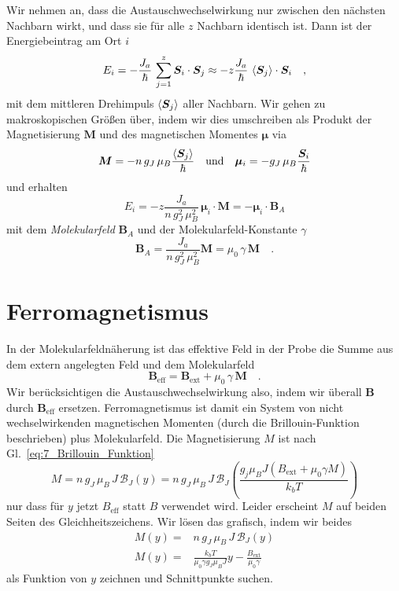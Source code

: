 Wir nehmen an, dass die Austauschwechselwirkung nur zwischen den nächsten Nachbarn wirkt, und dass sie für alle $z$  Nachbarn identisch ist. Dann ist der Energiebeintrag am Ort $i$
\begin{equation}
    E_i = - \frac{J_a}{\hbar} \, \sum_{j=1}^z \bm{S}_i \cdot \bm{S}_j 
    \approx
    - z \frac{J_a}{\hbar} \, \braket{\bm{S}_j} \cdot \bm{S}_i   \quad ,
\end{equation}
mit dem mittleren Drehimpuls $ \braket{\bm{S}_j}$ aller Nachbarn. Wir gehen zu makroskopischen Größen über, indem wir dies umschreiben als Produkt der Magnetisierung $\bm{M}$ und des magnetischen Momentes $\bm{\mu}$ via 
\begin{equation}
    \bm{M} = - n \, g_J \, \mu_B \frac{ \braket{\bm{S}_j}}{\hbar}
    \quad \text{und} \quad
    \bm{\mu}_i = - g_J  \, \mu_B \frac{ \bm{S}_i}{\hbar}
\end{equation}
und erhalten
\begin{equation}
    E_i  = - z \frac{J_a}{n \, g_J^2 \, \mu_B^2} \, \bm{\mu}_i  \cdot \bm{M}  = - \bm{\mu}_i \cdot \bm{B}_A
\end{equation}
mit dem \emph{Molekularfeld} $\bm{B}_A$ und der Molekularfeld-Konstante $\gamma$
\begin{equation}
    \bm{B}_A = \frac{J_a}{n \, g_J^2 \, \mu_B^2} \bm{M} 
   = \mu_0 \, \gamma \, \bm{M}   \quad . 
\end{equation}

\section*{Ferromagnetismus}

In  der Molekularfeldnäherung ist das effektive Feld in der Probe die Summe aus dem extern angelegten Feld und dem Molekularfeld
\begin{equation}
    \bm{B}_\text{eff} = \bm{B}_\text{ext} +  \mu_0 \, \gamma \, \bm{M}  \quad .
\end{equation}
Wir berücksichtigen die Austauschwechselwirkung also, indem wir überall $\bm{B}$ durch $\bm{B}_\text{eff}$ ersetzen. Ferromagnetismus ist damit ein System von nicht wechselwirkenden magnetischen Momenten (durch die Brillouin-Funktion beschrieben) plus Molekularfeld. Die Magnetisierung $M$ ist nach Gl.~\ref{eq:7_Brillouin_Funktion}
\begin{equation}
    M = n \, g_J \, \mu_B \, J \, \mathcal{B}_J(y)
    =  n \, g_J \, \mu_B \, J \, \mathcal{B}_J \left( \frac{g_j \mu_B J (B_\text{ext} + \mu_0 \gamma M)}{k_b T} \right)
\end{equation}
nur dass für $y$ jetzt $B_\text{eff}$ statt $B$ verwendet wird. Leider erscheint $M$ auf beiden Seiten des Gleichheitszeichens. Wir lösen das grafisch, indem wir beides 
\begin{eqnarray}
    M(y) = & n \, g_J \, \mu_B \, J \, \mathcal{B}_J(y)  \label{eq:7_inters1}\\
    M(y) =  & \frac{k_b T}{\mu_0 \gamma g_J \mu_B J} y - \frac{B_\text{ext}}{\mu_0 \gamma}  \label{eq:7_inters2}
\end{eqnarray}
als Funktion von $y$ zeichnen und Schnittpunkte suchen.


